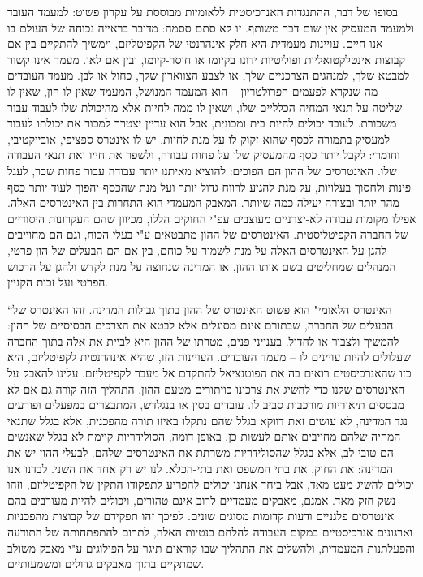 בסופו של דבר, ההתנגדות האנרכיסטית ללאומיות מבוססת על עקרון פשוט: למעמד העובד ולמעמד המעסיק אין שום דבר משותף. זו לא סתם ססמה: מדובר בראייה נכוחה של העולם בו אנו חיים. עויינות מעמדית היא חלק אינהרנטי של הקפיטליזם, וימשיך להתקיים בין אם קבוצות אינטלקטואליות ופוליטיות ידונו בקיומו או חוסר-קיומו, ובין אם לאו. מעמד אינו קשור למבטא שלך, למנהגים הצרכניים שלך, או לצבע הצווארון שלך, כחול או לבן. מעמד העובדים – מה שנקרא לפעמים הפרולטריון – הוא המעמד המנושל, המעמד שאין לו הון, שאין לו שליטה על תנאי המחיה הכלליים שלו, ושאין לו ממה לחיות אלא מהיכולת שלו לעבוד עבור משכורת. לעובד יכולים להיות בית ומכונית, אבל הוא עדיין יצטרך למכור את יכולתו לעבוד למעסיק בתמורה לכסף שהוא זקוק לו על מנת לחיות. יש לו אינטרס ספציפי, אובייקטיבי, וחומרי: לקבל יותר כסף מהמעסיק שלו על פחות עבודה, ולשפר את חייו ואת תנאי העבודה שלו. האינטרסים של ההון הם הפוכים: להוציא מאיתנו יותר עבודה עבור פחות שכר, לעגל פינות ולחסוך בעלויות, על מנת להגיע לרווח גדול יותר ועל מנת שהכסף יהפוך לעוד יותר כסף מהר יותר ובצורה יעילה כמה שיותר. המאבק המעמדי הוא התחרות בין האינטרסים האלה. אפילו מקומות עבודה לא-יצרניים מעוצבים עפ"י החוקים הללו, מכיוון שהם העקרונות היסודיים של החברה הקפיטליסטית. האינטרסים של ההון מתבטאים ע"י בעלי הכוח, וגם הם מחוייבים להגן על האינטרסים האלה על מנת לשמור על כוחם, בין אם הם הבעלים של הון פרטי, המנהלים שמחליטים בשם אותו ההון, או המדינה שנחוצה על מנת לקדש ולהגן על הרכוש הפרטי ועל זכות הקניין.

“האינטרס הלאומי" הוא פשוט האינטרס של ההון בתוך גבולות המדינה. זהו האינטרס של הבעלים של החברה, שבתורם אינם מסוגלים אלא לבטא את הצרכים הבסיסיים של ההון: להמשיך ולצבור או לחדול. בענייני פנים, מטרתו של ההון היא לביית את אלה בתוך החברה שעלולים להיות עויינים לו – מעמד העובדים. העויינות הזו, שהיא אינהרנטית לקפיטליזם, היא כזו שהאנרכיסטים רואים בה את הפוטנציאל להתקדם אל מעבר לקפיטליזם. עלינו להאבק על האינטרסים שלנו כדי להשיג את צרכינו כויתורים מטעם ההון. התהליך הזה קורה גם אם לא מבססים תיאוריות מורכבות סביב לו. עובדים בסין או בנגלדש, המתבצרים במפעלים ופורעים נגד המדינה, לא עושים זאת דווקא בגלל שהם נתקלו באיזו תורה מהפכנית, אלא בגלל שתנאי המחיה שלהם מחייבים אותם לעשות כן. באופן דומה, הסולידריות קיימת לא בגלל שאנשים הם טובי-לב, אלא בגלל שהסולידריות משרתת את האינטרסים שלהם. לבעלי ההון יש את המדינה: את החוק, את בתי המשפט ואת בתי-הכלא. לנו יש רק אחד את השני. לבדנו אנו יכולים להשיג מעט מאד, אבל ביחד אנחנו יכולים להפריע לתפקודו התקין של הקפיטליזם, וזהו נשק חזק מאד. אמנם, מאבקים מעמדיים לרוב אינם טהורים, ויכולים להיות מעורבים בהם אינטרסים פלגניים ודעות קדומות מסוגים שונים. לפיכך זהו תפקידם של קבוצות מהפכניות וארגונים אנרכיסטיים במקום העבודה להלחם בנטיות האלה, לתרום להתפתחותה של התודעה והפעלתנות המעמדית, ולהשלים את התהליך שבו קוראים תיגר על הפילוגים ע"י מאבק משולב שמתקיים בתוך מאבקים גדולים ומשמעותיים.

